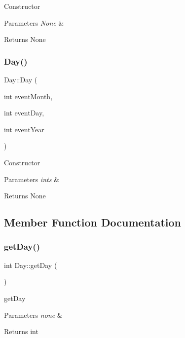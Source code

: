 Constructor 
\begin{DoxyParams}{Parameters}
{\em None} & \\
\hline
\end{DoxyParams}
\begin{DoxyReturn}{Returns}
None 
\end{DoxyReturn}
\mbox{\label{class_day_a03655a953feb734f962053622195f844}} 
\subsubsection{\texorpdfstring{Day()}{Day()}\hspace{0.1cm}{\footnotesize\ttfamily [2/2]}}
{\footnotesize\ttfamily Day\+::\+Day (\begin{DoxyParamCaption}\item[{int}]{event\+Month,  }\item[{int}]{event\+Day,  }\item[{int}]{event\+Year }\end{DoxyParamCaption})}

Constructor 
\begin{DoxyParams}{Parameters}
{\em ints} & \\
\hline
\end{DoxyParams}
\begin{DoxyReturn}{Returns}
None 
\end{DoxyReturn}


\subsection{Member Function Documentation}
\mbox{\label{class_day_a60bd0b5910b263328d8ae628b5b03f33}} 
\subsubsection{\texorpdfstring{get\+Day()}{getDay()}}
{\footnotesize\ttfamily int Day\+::get\+Day (\begin{DoxyParamCaption}{ }\end{DoxyParamCaption})}

get\+Day 
\begin{DoxyParams}{Parameters}
{\em none} & \\
\hline
\end{DoxyParams}
\begin{DoxyReturn}{Returns}
int 
\end{DoxyReturn}
\mbox{\label{class_day_a24a3d4d6a93001fc11e93701dc4bf2ad}} 
